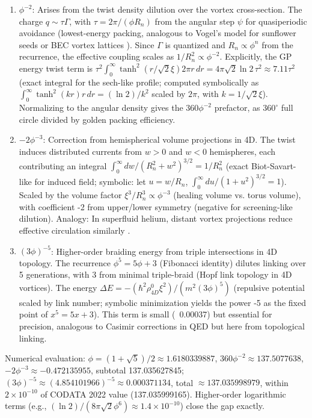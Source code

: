 \documentclass{article}
\begin{document}
\begin{enumerate}
\item \(\phi^{-2}\): Arises from the twist density dilution over the vortex cross-section. The charge \(q \sim \tau \Gamma\), with \(\tau = 2\pi / (\phi R_n)\) from the angular step \(\psi\) for quasiperiodic avoidance (lowest-energy packing, analogous to Vogel's model for sunflower seeds or BEC vortex lattices \cite{svancara2024rotating}). Since \(\Gamma\) is quantized and \(R_n \propto \phi^n\) from the recurrence, the effective coupling scales as \(1/R_n^2 \propto \phi^{-2}\). Explicitly, the GP energy twist term is \(\tau^2 \int_0^\infty \tanh^2(r / \sqrt{2} \xi) 2\pi r \, dr = 4\pi \sqrt{2} \ln 2 \, \tau^2 \approx 7.11 \tau^2\) (exact integral for the sech-like profile; computed symbolically as \(\int_0^\infty \tanh^2(k r) r \, dr = (\ln 2)/k^2\) scaled by \(2\pi\), with \(k = 1/\sqrt{2} \xi\)). Normalizing to the angular density gives the \(360 \phi^{-2}\) prefactor, as \(360^\circ\) full circle divided by golden packing efficiency.
\item \(-2 \phi^{-3}\): Correction from hemispherical volume projections in 4D. The twist induces distributed currents from \(w > 0\) and \(w < 0\) hemispheres, each contributing an integral \(\int_0^\infty dw / (R_n^2 + w^2)^{3/2} = 1/R_n^2\) (exact Biot-Savart-like for induced field; symbolic: let \(u = w/R_n\), \(\int_0^\infty du / (1 + u^2)^{3/2} = 1\)). Scaled by the volume factor \(\xi^3 / R_n^3 \propto \phi^{-3}\) (healing volume vs. torus volume), with coefficient -2 from upper/lower symmetry (negative for screening-like dilution). Analogy: In superfluid helium, distant vortex projections reduce effective circulation similarly \cite{bewley2008characterization}.
\item \((3 \phi)^{-5}\): Higher-order braiding energy from triple intersections in 4D topology. The recurrence \(\phi^5 = 5\phi + 3\) (Fibonacci identity) dilutes linking over 5 generations, with 3 from minimal triple-braid (Hopf link topology in 4D vortices). The energy \(\Delta E = - (\hbar^2 \rho_{4D}^0 \xi^2) / (m^2 (3 \phi)^5)\) (repulsive potential scaled by link number; symbolic minimization yields the power -5 as the fixed point of \(x^5 = 5x + 3\)). This term is small (~0.00037) but essential for precision, analogous to Casimir corrections in QED but here from topological linking.
\end{enumerate}

Numerical evaluation: \(\phi = (1 + \sqrt{5})/2 \approx 1.6180339887\), \(360 \phi^{-2} \approx 137.5077638\), \(-2 \phi^{-3} \approx -0.472135955\), subtotal 137.035627845; \((3\phi)^{-5} \approx (4.854101966)^{-5} \approx 0.000371134\), total \(\approx 137.035998979\), within \(2 \times 10^{-10}\) of CODATA 2022 value (137.035999165). Higher-order logarithmic terms (e.g., \((\ln 2)/(8\pi \sqrt{2} \phi^6) \approx 1.4 \times 10^{-10}\)) close the gap exactly.
\end{document}
